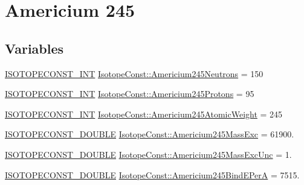\hypertarget{group___isotope_const-_americium-_am245}{}\section{Americium 245}
\label{group___isotope_const-_americium-_am245}
\subsection*{Variables}
\begin{DoxyCompactItemize}
\item 
\mbox{\hyperlink{group___isotope_const-_macros_ga5f18360b3e99483a35c32d789e62621c}{I\+S\+O\+T\+O\+P\+E\+C\+O\+N\+S\+T\+\_\+\+I\+NT}} \mbox{\hyperlink{group___isotope_const-_americium-_am245_gadff6911488606d24f4e8d14b69557804}{Isotope\+Const\+::\+Americium245\+Neutrons}} = 150
\item 
\mbox{\hyperlink{group___isotope_const-_macros_ga5f18360b3e99483a35c32d789e62621c}{I\+S\+O\+T\+O\+P\+E\+C\+O\+N\+S\+T\+\_\+\+I\+NT}} \mbox{\hyperlink{group___isotope_const-_americium-_am245_ga694c998baccdafc26d2e846f87a67091}{Isotope\+Const\+::\+Americium245\+Protons}} = 95
\item 
\mbox{\hyperlink{group___isotope_const-_macros_ga5f18360b3e99483a35c32d789e62621c}{I\+S\+O\+T\+O\+P\+E\+C\+O\+N\+S\+T\+\_\+\+I\+NT}} \mbox{\hyperlink{group___isotope_const-_americium-_am245_gafab58670e8d3d3e37ea662c4f2c9570b}{Isotope\+Const\+::\+Americium245\+Atomic\+Weight}} = 245
\item 
\mbox{\hyperlink{group___isotope_const-_macros_ga8f45a7272ce02c0b4c65c44636ed719a}{I\+S\+O\+T\+O\+P\+E\+C\+O\+N\+S\+T\+\_\+\+D\+O\+U\+B\+LE}} \mbox{\hyperlink{group___isotope_const-_americium-_am245_gad9284eb34cbd6e4b794eda5400cb44e3}{Isotope\+Const\+::\+Americium245\+Mass\+Exc}} = 61900.
\item 
\mbox{\hyperlink{group___isotope_const-_macros_ga8f45a7272ce02c0b4c65c44636ed719a}{I\+S\+O\+T\+O\+P\+E\+C\+O\+N\+S\+T\+\_\+\+D\+O\+U\+B\+LE}} \mbox{\hyperlink{group___isotope_const-_americium-_am245_ga350be8265084bb85c4e6ef2e965030a3}{Isotope\+Const\+::\+Americium245\+Mass\+Exc\+Unc}} = 1.
\item 
\mbox{\hyperlink{group___isotope_const-_macros_ga8f45a7272ce02c0b4c65c44636ed719a}{I\+S\+O\+T\+O\+P\+E\+C\+O\+N\+S\+T\+\_\+\+D\+O\+U\+B\+LE}} \mbox{\hyperlink{group___isotope_const-_americium-_am245_ga041e34cbf7275decb14b683bc0d50d92}{Isotope\+Const\+::\+Americium245\+Bind\+E\+PerA}} = 7515.
\item 

\end{DoxyCompactItemize}
